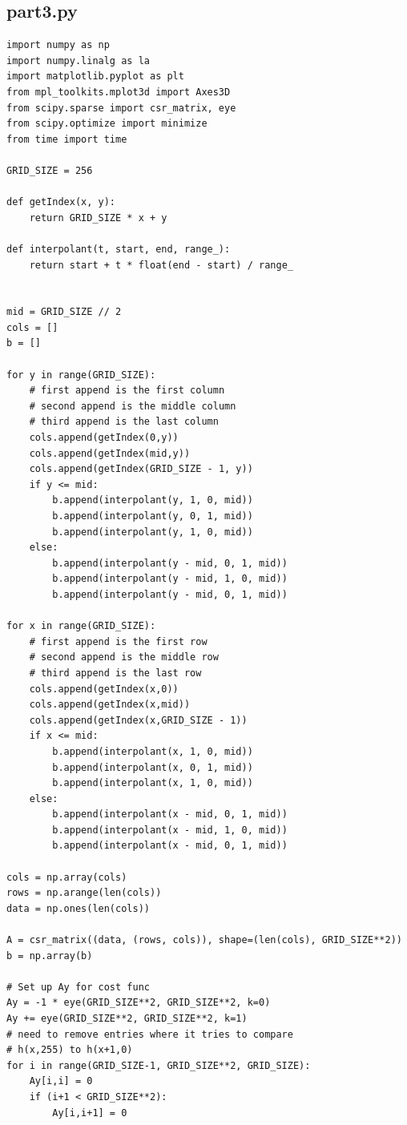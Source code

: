 \documentclass{article}
\begin{document}
\subsection{part3.py}
\begin{verbatim}
import numpy as np
import numpy.linalg as la
import matplotlib.pyplot as plt
from mpl_toolkits.mplot3d import Axes3D
from scipy.sparse import csr_matrix, eye
from scipy.optimize import minimize
from time import time

GRID_SIZE = 256

def getIndex(x, y):
    return GRID_SIZE * x + y

def interpolant(t, start, end, range_):
    return start + t * float(end - start) / range_
    

mid = GRID_SIZE // 2
cols = []
b = []

for y in range(GRID_SIZE):
    # first append is the first column
    # second append is the middle column
    # third append is the last column
    cols.append(getIndex(0,y))
    cols.append(getIndex(mid,y))
    cols.append(getIndex(GRID_SIZE - 1, y))
    if y <= mid:
        b.append(interpolant(y, 1, 0, mid))
        b.append(interpolant(y, 0, 1, mid))
        b.append(interpolant(y, 1, 0, mid))
    else:
        b.append(interpolant(y - mid, 0, 1, mid))
        b.append(interpolant(y - mid, 1, 0, mid))
        b.append(interpolant(y - mid, 0, 1, mid))

for x in range(GRID_SIZE):
    # first append is the first row
    # second append is the middle row
    # third append is the last row
    cols.append(getIndex(x,0))
    cols.append(getIndex(x,mid))
    cols.append(getIndex(x,GRID_SIZE - 1))
    if x <= mid:
        b.append(interpolant(x, 1, 0, mid))
        b.append(interpolant(x, 0, 1, mid))
        b.append(interpolant(x, 1, 0, mid))
    else:
        b.append(interpolant(x - mid, 0, 1, mid))
        b.append(interpolant(x - mid, 1, 0, mid))
        b.append(interpolant(x - mid, 0, 1, mid))

cols = np.array(cols)
rows = np.arange(len(cols))
data = np.ones(len(cols))

A = csr_matrix((data, (rows, cols)), shape=(len(cols), GRID_SIZE**2))
b = np.array(b)

# Set up Ay for cost func
Ay = -1 * eye(GRID_SIZE**2, GRID_SIZE**2, k=0)
Ay += eye(GRID_SIZE**2, GRID_SIZE**2, k=1)
# need to remove entries where it tries to compare
# h(x,255) to h(x+1,0)
for i in range(GRID_SIZE-1, GRID_SIZE**2, GRID_SIZE):
    Ay[i,i] = 0
    if (i+1 < GRID_SIZE**2):
        Ay[i,i+1] = 0


\end{verbatim}
\end{document}
